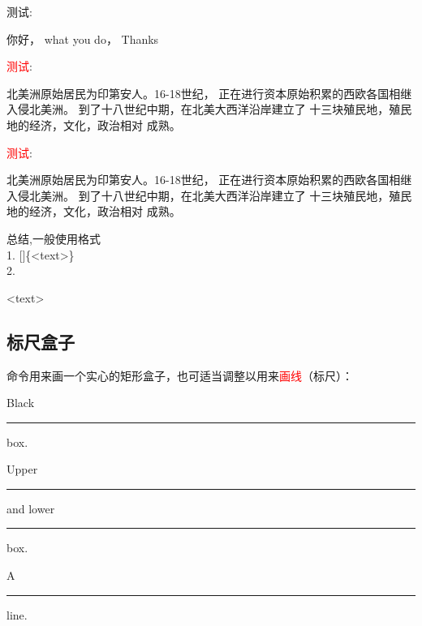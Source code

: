 \documentclass[fontset=windows, 12pt]{article}
\begin{document}
\vspace*{4em}
\begin{example}
测试:\parbox[t]{4em}%
    {你好， what you do， Thanks}    
\end{example}

\vspace*{4em}
\begin{example}
\end{example}

\vspace*{4em}
\begin{example}
\textcolor{red}{测试}:\parbox[t]{8em}%
    {北美洲原始居民为印第安人。16-18世纪，
    正在进行资本原始积累的西欧各国相继入侵北美洲。
    到了十八世纪中期，在北美大西洋沿岸建立了
    十三块殖民地，殖民地的经济，文化，政治相对
    成熟。}  
\end{example}


\vspace*{4em}
\begin{example}
\textcolor{red}{测试}:\parbox[b]{8em}%
    {北美洲原始居民为印第安人。16-18世纪，
    正在进行资本原始积累的西欧各国相继入侵北美洲。
    到了十八世纪中期，在北美大西洋沿岸建立了
    十三块殖民地，殖民地的经济，文化，政治相对
    成熟。}  
\end{example}

{
    \kaishu 
    总结,一般使用格式\\
    1. []\{<text>\}\\
    2.\\
    \par
    \par
    \par
    \par
    \par
    <text>\\
}

\subsection{标尺盒子}
 命令用来画一个实心的矩形盒子，也可适当调整以用来\textcolor{red}{画线}（标尺）：
\begin{command}
\end{command}
\begin{example}
Black \rule{12pt}{4pt} box.

Upper \rule[4pt]{6pt}{8pt} and
lower \rule[-4pt]{6pt}{8pt} box.

A \rule[-.4pt]{3em}{.4pt} line.
\end{example}
\end{document}
